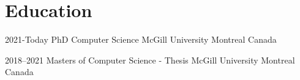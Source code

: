 
\section{Education}

    \cventry
        {2021-Today}
        {PhD Computer Science}
        {McGill University}
        {Montreal}
        {Canada}
        {
        {
        }
    }  %

    \cventry
        {2018--2021}
        {Masters of Computer Science - Thesis}
        {McGill University}
        {Montreal}
        {Canada}
        {
        }  %
    
